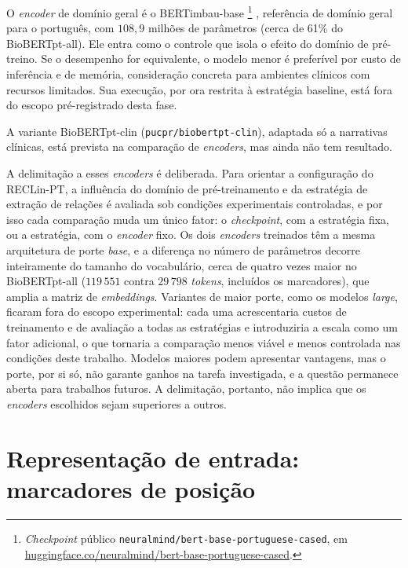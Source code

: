 O \emph{encoder} de domínio geral é o BERTimbau-base
\footnote{\emph{Checkpoint} público \texttt{neuralmind/bert-base-portuguese-cased}, em
\href{https://huggingface.co/neuralmind/bert-base-portuguese-cased}{huggingface.co/neuralmind/bert-base-portuguese-cased}.}
\cite{souza_2020_bertimbau}, referência de domínio geral para o português, com
$108{,}9$ milhões de parâmetros (cerca de 61\% do BioBERTpt-all). Ele entra como o
controle que isola o efeito do domínio de pré-treino. Se o desempenho for
equivalente, o modelo menor é preferível por custo de inferência e de memória,
consideração concreta para ambientes clínicos com recursos limitados. Sua execução,
por ora restrita à estratégia baseline, está fora do escopo pré-registrado desta
fase.

A variante BioBERTpt-clin (\texttt{pucpr/biobertpt-clin}), adaptada só a
narrativas clínicas, está prevista na comparação de \emph{encoders}, mas ainda não
tem resultado.

A delimitação a esses \emph{encoders} é deliberada. Para orientar a configuração do
RECLin-PT, a influência do domínio de pré-treinamento e da estratégia de extração de
relações é avaliada sob condições experimentais controladas, e por isso cada
comparação muda um único fator: o \emph{checkpoint}, com a estratégia fixa, ou a
estratégia, com o \emph{encoder} fixo. Os dois \emph{encoders} treinados têm a mesma
arquitetura de porte \emph{base}, e a diferença no número de parâmetros decorre
inteiramente do tamanho do vocabulário, cerca de quatro vezes maior no BioBERTpt-all
($119\,551$ contra $29\,798$ \emph{tokens}, incluídos os marcadores), que amplia a
matriz de \emph{embeddings}. Variantes de maior porte, como os modelos \emph{large}, ficaram fora do
escopo experimental: cada uma acrescentaria custos de treinamento e de avaliação a
todas as estratégias e introduziria a escala como um fator adicional, o que tornaria
a comparação menos viável e menos controlada nas condições deste trabalho. Modelos
maiores podem apresentar vantagens, mas o porte, por si só, não garante ganhos na
tarefa investigada, e a questão permanece aberta para trabalhos futuros. A
delimitação, portanto, não implica que os \emph{encoders} escolhidos sejam superiores
a outros.

\section{Representação de entrada: marcadores de posição}
\label{sec:markers}

